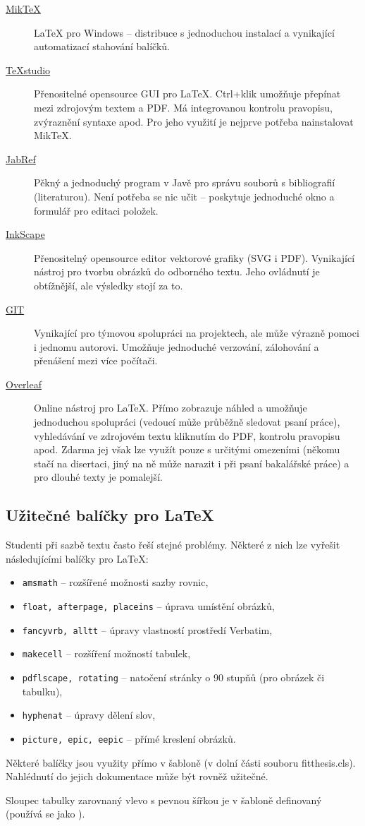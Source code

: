 \begin{description}
	\item[\href{http://miktex.org/download}{MikTeX}] \LaTeX{} pro Windows -- distribuce s jednoduchou instalací a vynikající automatizací stahování balíčků.
	\item[\href{http://texstudio.sourceforge.net/}{TeXstudio}] Přenositelné opensource GUI pro \LaTeX{}.  Ctrl+klik umožňuje přepínat mezi zdrojovým textem a PDF. Má integrovanou kontrolu pravopisu, zvýraznění syntaxe apod. Pro jeho využití je nejprve potřeba nainstalovat MikTeX.
	\item[\href{http://jabref.sourceforge.net/download.php}{JabRef}] Pěkný a jednoduchý program v Javě pro správu souborů s bibliografií (literaturou). Není potřeba se nic učit -- poskytuje jednoduché okno a formulář pro editaci položek.
	\item[\href{https://inkscape.org/en/download/}{InkScape}] Přenositelný opensource editor vektorové grafiky (SVG i PDF). Vynikající nástroj pro tvorbu obrázků do odborného textu. Jeho ovládnutí je obtížnější, ale výsledky stojí za to.
	\item[\href{https://git-scm.com/}{GIT}] Vynikající pro týmovou spolupráci na projektech, ale může výrazně pomoci i jednomu autorovi. Umožňuje jednoduché verzování, zálohování a přenášení mezi více počítači.
	\item[\href{http://www.overleaf.com/}{Overleaf}] Online nástroj pro \LaTeX{}. Přímo zobrazuje náhled a umožňuje jednoduchou spolupráci (vedoucí může průběžně sledovat psaní práce), vyhledávání ve zdrojovém textu kliknutím do PDF, kontrolu pravopisu apod. Zdarma jej však lze využít pouze s určitými omezeními (někomu stačí na disertaci, jiný na ně může narazit i při psaní bakalářské práce) a pro dlouhé texty je pomalejší.
\end{description}

\subsection*{Užitečné balíčky pro \LaTeX}

Studenti při sazbě textu často řeší stejné problémy. Některé z nich lze vyřešit následujícími balíčky pro \LaTeX:

\begin{itemize}
  \item \verb|amsmath| -- rozšířené možnosti sazby rovnic,
  \item \verb|float, afterpage, placeins| -- úprava umístění obrázků,
  \item \verb|fancyvrb, alltt| -- úpravy vlastností prostředí Verbatim, 
  \item \verb|makecell| -- rozšíření možností tabulek,
  \item \verb|pdflscape, rotating| -- natočení stránky o 90 stupňů (pro obrázek či tabulku),
  \item \verb|hyphenat| -- úpravy dělení slov,
  \item \verb|picture, epic, eepic| -- přímé kreslení obrázků.
\end{itemize}

Některé balíčky jsou využity přímo v šabloně (v dolní části souboru fitthesis.cls). Nahlédnutí do jejich dokumentace může být rovněž užitečné.

Sloupec tabulky zarovnaný vlevo s pevnou šířkou je v šabloně definovaný  (používá se jako ).

